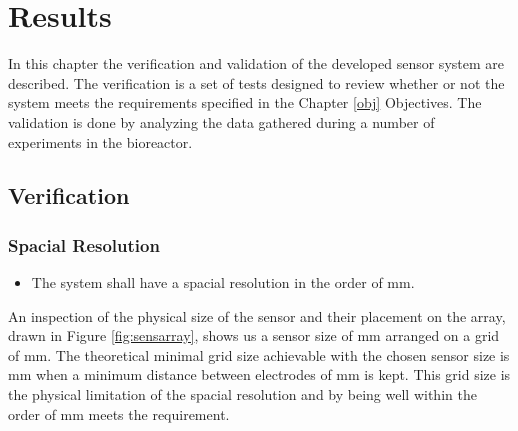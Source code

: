 \chapter{Results}

In this chapter the verification and validation of the developed sensor system are described. The verification is a set of tests designed to review whether or not the system meets the requirements specified in the Chapter \ref{obj} Objectives. The validation is done by analyzing the data gathered during a number of experiments in the bioreactor.

\section{Verification}

\subsection{Spacial Resolution}

\begin{itemize}
\item The system shall have a spacial resolution in the order of \unit[10]{mm}.
\end{itemize}

An inspection of the physical size of the sensor and their placement on the array, drawn in Figure \ref{fig:sensarray}, shows us a sensor size of \unit[10x11]{mm} arranged on a grid of \unit[25x50]{mm}. The theoretical minimal grid size achievable with the chosen sensor size is \unit[11x12]{mm} when a minimum distance between electrodes of \unit[1]{mm} is kept.
This grid size is the physical limitation of the spacial resolution and by being well within the order of \unit[10]{mm} meets the requirement.\\

